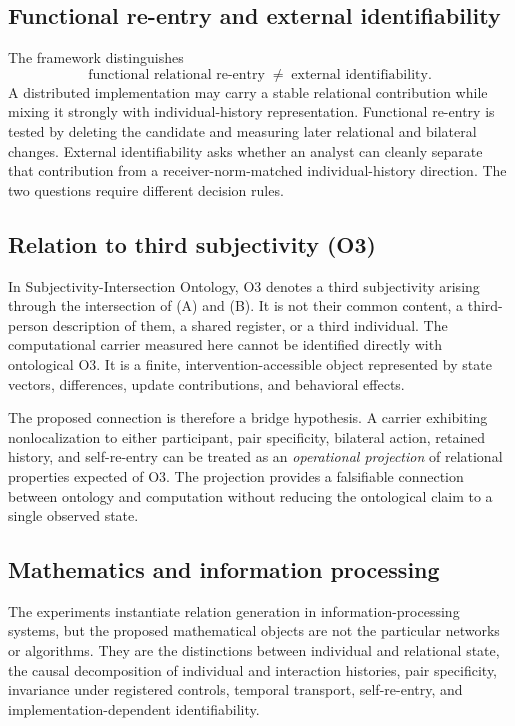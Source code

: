 \documentclass[11pt,a4paper]{article}
\begin{document}
\subsection{Functional re-entry and external identifiability}

The framework distinguishes
\begin{equation}
  \text{functional relational re-entry}
  \;\neq\;
  \text{external identifiability}.
  \label{eq:distinct}
\end{equation}
A distributed implementation may carry a stable relational contribution while mixing it strongly with individual-history representation. Functional re-entry is tested by deleting the candidate and measuring later relational and bilateral changes. External identifiability asks whether an analyst can cleanly separate that contribution from a receiver-norm-matched individual-history direction. The two questions require different decision rules.

\subsection{Relation to third subjectivity (O3)}

In Subjectivity-Intersection Ontology, O3 denotes a third subjectivity arising through the intersection of (A) and (B). It is not their common content, a third-person description of them, a shared register, or a third individual. The computational carrier measured here cannot be identified directly with ontological O3. It is a finite, intervention-accessible object represented by state vectors, differences, update contributions, and behavioral effects.

The proposed connection is therefore a bridge hypothesis. A carrier exhibiting nonlocalization to either participant, pair specificity, bilateral action, retained history, and self-re-entry can be treated as an \emph{operational projection} of relational properties expected of O3. The projection provides a falsifiable connection between ontology and computation without reducing the ontological claim to a single observed state.

\subsection{Mathematics and information processing}

The experiments instantiate relation generation in information-processing systems, but the proposed mathematical objects are not the particular networks or algorithms. They are the distinctions between individual and relational state, the causal decomposition of individual and interaction histories, pair specificity, invariance under registered controls, temporal transport, self-re-entry, and implementation-dependent identifiability.
\end{document}
